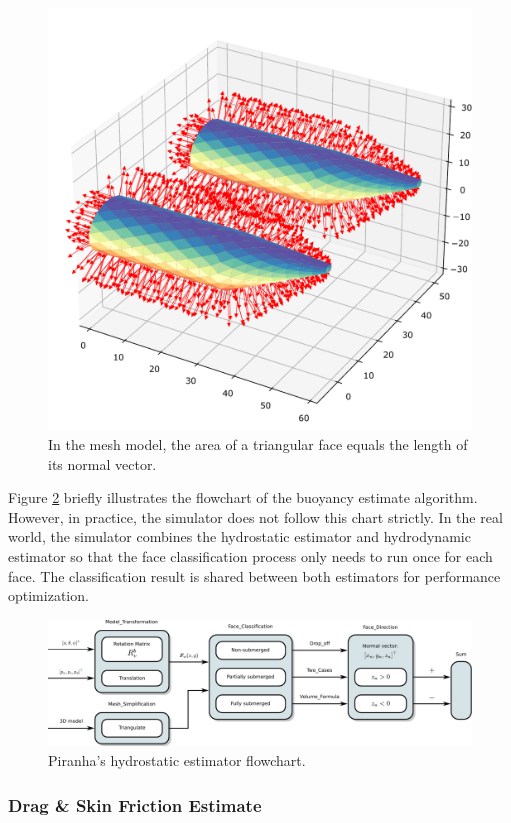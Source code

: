 \begin{figure}[H]
    \centering
    \includegraphics[width=.6\textwidth]{images/04normal-vector.pdf}
    \caption{In the mesh model, the area of a triangular face equals the length of its normal vector.}
    \label{fig:04normal-vector}
\end{figure}

Figure \ref{fig:04hydrostatic-flowchart} briefly illustrates the flowchart of the buoyancy estimate algorithm. However, in practice, the simulator does not follow this chart strictly. In the real world, the simulator combines the hydrostatic estimator and hydrodynamic estimator so that the face classification process only needs to run once for each face. The classification result is shared between both estimators for performance optimization.  

\begin{figure}[H]
    \centering
    \includegraphics[width=\textwidth]{images/04hydrostatics_flowchart.pdf}
    \caption{Piranha's hydrostatic estimator flowchart.}
    \label{fig:04hydrostatic-flowchart}
\end{figure}

\subsubsection{Drag \& Skin Friction Estimate}

